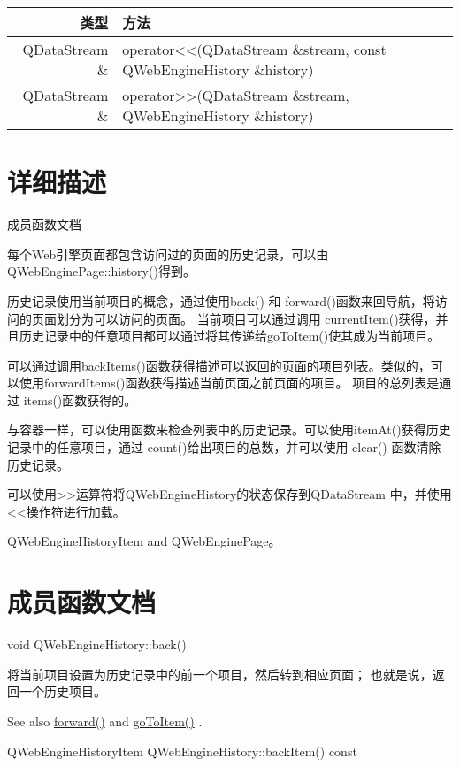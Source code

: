 \begin{tabular}{|r|l|}
	\hline
	类型 & 方法 \\
	\hline
	QDataStream \&	& operator<<(QDataStream \&stream, const QWebEngineHistory \&history)\\
	\hline
	QDataStream \&	&operator>>(QDataStream \&stream, QWebEngineHistory \&history) \\
	\hline
\end{tabular}

\section{详细描述}

成员函数文档

每个Web引擎页面都包含访问过的页面的历史记录，可以由QWebEnginePage::history()得到。

历史记录使用当前项目的概念，通过使用back() 和 forward()函数来回导航，将访问的页面划分为可以访问的页面。 当前项目可以通过调用 currentItem()获得，并且历史记录中的任意项目都可以通过将其传递给goToItem()使其成为当前项目。

可以通过调用backItems()函数获得描述可以返回的页面的项目列表。类似的，可以使用forwardItems()函数获得描述当前页面之前页面的项目。 项目的总列表是通过 items()函数获得的。

与容器一样，可以使用函数来检查列表中的历史记录。可以使用itemAt()获得历史记录中的任意项目，通过 count()给出项目的总数，并可以使用 clear() 函数清除历史记录。

可以使用>>运算符将QWebEngineHistory的状态保存到QDataStream 中，并使用<<操作符进行加载。

\begin{seeAlso}
QWebEngineHistoryItem and QWebEnginePage。
\end{seeAlso}


\section{成员函数文档}

void QWebEngineHistory::back()

将当前项目设置为历史记录中的前一个项目，然后转到相应页面； 也就是说，返回一个历史项目。

See also \href{https://doc.qt.io/qt-5/qwebenginehistory.html#forward}{forward()}  and \href{https://doc.qt.io/qt-5/qwebenginehistory.html#goToItem}{goToItem()} .


QWebEngineHistoryItem QWebEngineHistory::backItem() const

